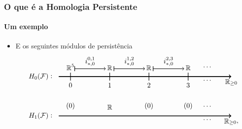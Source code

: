 \documentclass[11pt]{beamer}
\DeclareMathOperator{\R}{\mathbb{R}}
\theoremstyle{remark}
\theoremstyle{definition}
\theoremstyle{plain}
\begin{document}
    \begin{frame}
        \frametitle{O que é a Homologia Persistente}
        \framesubtitle{Um exemplo}
        \begin{itemize}
            \item
                E os seguintes módulos de persistência
                \[
                    \begin{tikzpicture}[scale=2]
                        \begin{scope}
                            \draw[->, very thick] (-0.3,0) -- (4.1,0) node[right, below]
                                {$\R_{\geq 0}$};
                            \node[left] at (-0.5,0) {$H_0(\mathcal{F})$};
                            \node[left] at (-0.4,0) {:};

                            \node[above] at (0,0.1) {$\R^5$};
                            \node[above] at (1,0.1) {$\R$};
                            \node[above] at (2,0.1) {$\R$};
                            \node[above] at (3,0.1) {$\R$};
                            \node[above] at (3.5,0.14) {$\cdots$};
                            \node[above] at (3.5,-0.2) {$\cdots$};
                            
                            \draw[-, thick] (0,0.1) --  (0,-0.1) node[below] {$0$}; 
                            \draw[-, thick] (1,0.1) --  (1,-0.1) node[below] {$1$}; 
                            \draw[-, thick] (2,0.1) --  (2,-0.1) node[below] {$2$}; 
                            \draw[-, thick] (3,0.1) --  (3,-0.1) node[below] {$3$}; 

                            \draw[ |->, thick] (0.1, 0.2) -- (0.9, 0.2) node[midway, above]
                                {$i_{\ast, 0}^{0,1}$};
                            \draw[ |->, thick] (1.1, 0.2) -- (1.9, 0.2) node[midway, above]
                                {$i_{\ast, 0}^{1,2}$};
                            \draw[ |->, thick] (2.1, 0.2) -- (2.9, 0.2) node[midway, above]
                                {$i_{\ast, 0}^{2,3}$};
                        \end{scope}
                        \begin{scope}[shift={(0,-1)}]
                            \draw[->, very thick] (-0.3,0) -- (4.1,0) node[right, below]
                                {$\R_{\geq 0},$};
                            \node[left] at (-0.5,0) {$H_1(\mathcal{F})$};
                            \node[left] at (-0.4,0) {:};

                            \node[above] at (0,0.1) {$(0)$};
                            \node[above] at (1,0.1) {$\R$};
                            \node[above] at (2,0.1) {$(0)$};
                            \node[above] at (3,0.1) {$(0)$};
                            \node[above] at (3.5,0.14) {$\cdots$};
                            \node[above] at (3.5,-0.2) {$\cdots$};
                            

\end{scope}
\end{tikzpicture}\]
\end{itemize}
\end{frame}
\end{document}
